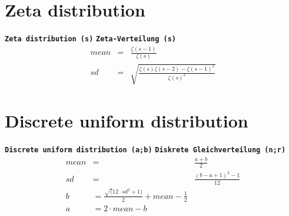 \documentclass{svmono}
\def\cm#1{\textbf{\texttt{#1}}}
\begin{document}
\section*{Zeta distribution}
\cm{Zeta distribution (s)}
\cm{Zeta-Verteilung (s)}
\begin{eqnarray*}
mean&=&\frac{\zeta(s-1)}{\zeta(s)}\\
sd&=&\sqrt{\frac{\zeta(s)\zeta(s-2)-\zeta(s-1)^2}{\zeta(s)^2}}
\end{eqnarray*}





\section*{Discrete uniform distribution}
\cm{Discrete uniform distribution (a;b)}
\cm{Diskrete Gleichverteilung (n;r)}
\begin{eqnarray*}
mean&=&\frac{a+b}{2}\\
sd&=&\frac{(b-a+1)^2-1}{12}\\
b&=\frac{\sqrt(12\cdot sd^2+1)}{2}+mean-\frac{1}{2}\\
a&=2\cdot mean-b&
\end{eqnarray*}
\end{document}
